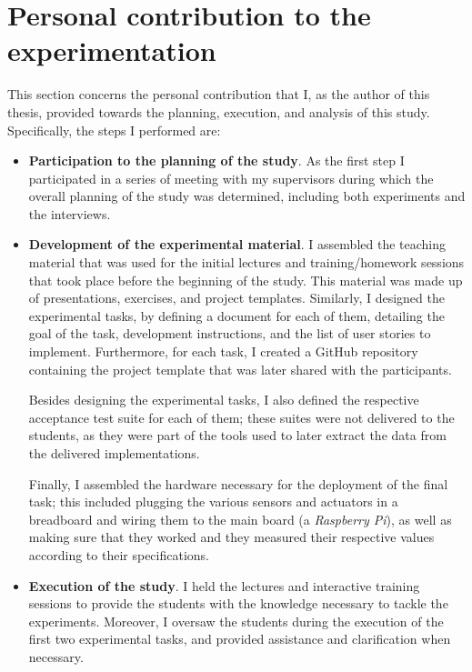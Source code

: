\section{Personal contribution to the experimentation}
This section concerns the personal contribution that I, as the author of this thesis, provided towards the planning, execution, and analysis of this study.
Specifically, the steps I performed are:

\begin{itemize}
    \item \textbf{Participation to the planning of the study}. As the first step I participated in a series of meeting with my supervisors during which the overall planning of the study was determined, including both experiments and the interviews.

    \item \textbf{Development of the experimental material}. I assembled  the teaching material that was used for the initial lectures and training/homework sessions that took place before the beginning of the study. This material was made up of presentations, exercises, and project templates.
    Similarly, I designed the experimental tasks, by defining a document for each of them, detailing the goal of the task, development instructions, and the list of user stories to implement. Furthermore, for each task, I created a GitHub repository containing the project template that was later shared with the participants.

    Besides designing the experimental tasks, I also defined the respective acceptance test suite for each of them; these suites were not delivered to the students, as they were part of the tools used to later extract the data from the delivered implementations.

    Finally, I assembled the hardware necessary for the deployment of the final task; this included plugging the various sensors and actuators in a breadboard and wiring them to the main board (a \textit{Raspberry Pi}), as well as making sure that they worked and they measured their respective values according to their specifications.

    \item \textbf{Execution of the study}. 
    I held the lectures and interactive training sessions to provide the students with the knowledge necessary to tackle the experiments. 
    Moreover, I oversaw the students during the execution of the first two experimental tasks, and provided assistance and clarification when necessary.


\end{itemize}
